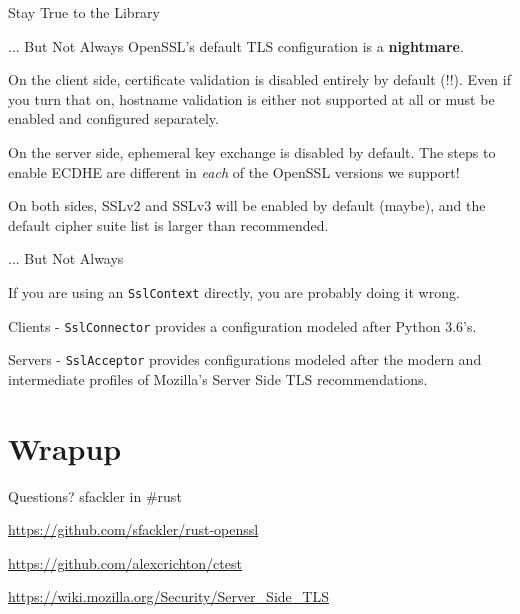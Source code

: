 \documentclass{beamer}
\begin{document}
\begin{frame}{Stay True to the Library}
    
\end{frame}

\begin{frame}[fragile]{... But Not Always}
    OpenSSL's default TLS configuration is a \textbf{nightmare}.

    On the client side, certificate validation is disabled entirely by default
    (!!). Even if you turn that on, hostname validation is either not supported
    at all or must be enabled and configured separately.

    On the server side, ephemeral key exchange is disabled by default. The
    steps to enable ECDHE are different in \emph{each} of the OpenSSL versions
    we support!

    On both sides, SSLv2 and SSLv3 will be enabled by default (maybe), and the
    default cipher suite list is larger than recommended.
\end{frame}

\begin{frame}[fragile]{... But Not Always}
    \begin{center}
        \Large If you are using an \verb!SslContext! directly, you are probably
        doing it wrong.
    \end{center}

    \pause

    Clients - \verb!SslConnector! provides a configuration modeled after Python
    3.6's.

    Servers - \verb!SslAcceptor! provides configurations modeled after the
    modern and intermediate profiles of Mozilla's Server Side TLS
    recommendations.
\end{frame}

\section{Wrapup}

\begin{frame}{Questions?}
    sfackler in \#rust

    \url{https://github.com/sfackler/rust-openssl}

    \url{https://github.com/alexcrichton/ctest}

    \url{https://wiki.mozilla.org/Security/Server_Side_TLS}
\end{frame}
\end{document}
